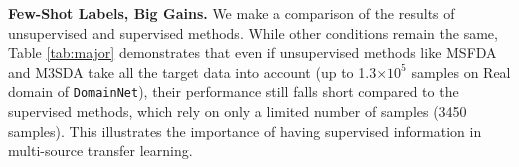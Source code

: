 \textbf{Few-Shot Labels, Big Gains.} We make a comparison of the results of unsupervised and supervised methods. While other conditions remain the same, 
Table \ref{tab:major} demonstrates that even if unsupervised methods like MSFDA and M3SDA take all the target data into account (up to 1.3×$10^5$ samples on Real domain of \texttt{DomainNet}), their performance still falls short compared to the supervised methods, which rely on only a limited number of samples (3450 samples). This illustrates the importance of having supervised information in multi-source transfer learning.\\

